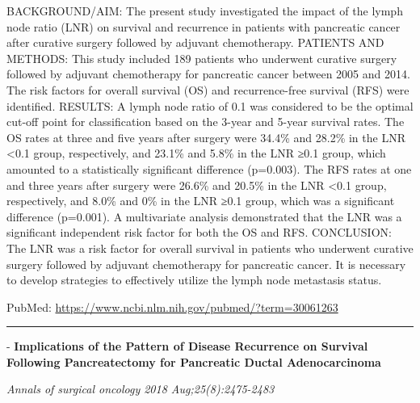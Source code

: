 \documentclass[]{article}
\begin{document}
BACKGROUND/AIM: The present study investigated the impact of the lymph
node ratio (LNR) on survival and recurrence in patients with pancreatic
cancer after curative surgery followed by adjuvant chemotherapy.
PATIENTS AND METHODS: This study included 189 patients who underwent
curative surgery followed by adjuvant chemotherapy for pancreatic cancer
between 2005 and 2014. The risk factors for overall survival (OS) and
recurrence-free survival (RFS) were identified. RESULTS: A lymph node
ratio of 0.1 was considered to be the optimal cut-off point for
classification based on the 3-year and 5-year survival rates. The OS
rates at three and five years after surgery were 34.4\% and 28.2\% in
the LNR \textless{}0.1 group, respectively, and 23.1\% and 5.8\% in the
LNR ≥0.1 group, which amounted to a statistically significant difference
(p=0.003). The RFS rates at one and three years after surgery were
26.6\% and 20.5\% in the LNR \textless{}0.1 group, respectively, and
8.0\% and 0\% in the LNR ≥0.1 group, which was a significant difference
(p=0.001). A multivariate analysis demonstrated that the LNR was a
significant independent risk factor for both the OS and RFS. CONCLUSION:
The LNR was a risk factor for overall survival in patients who underwent
curative surgery followed by adjuvant chemotherapy for pancreatic
cancer. It is necessary to develop strategies to effectively utilize the
lymph node metastasis status.

PubMed: \url{https://www.ncbi.nlm.nih.gov/pubmed/?term=30061263}

{}

{}

\begin{center}\rule{0.5\linewidth}{\linethickness}\end{center}

 - \textbf{Implications of the Pattern of Disease Recurrence on Survival
Following Pancreatectomy for Pancreatic Ductal Adenocarcinoma}

\emph{Annals of surgical oncology 2018 Aug;25(8):2475-2483}
\end{document}
